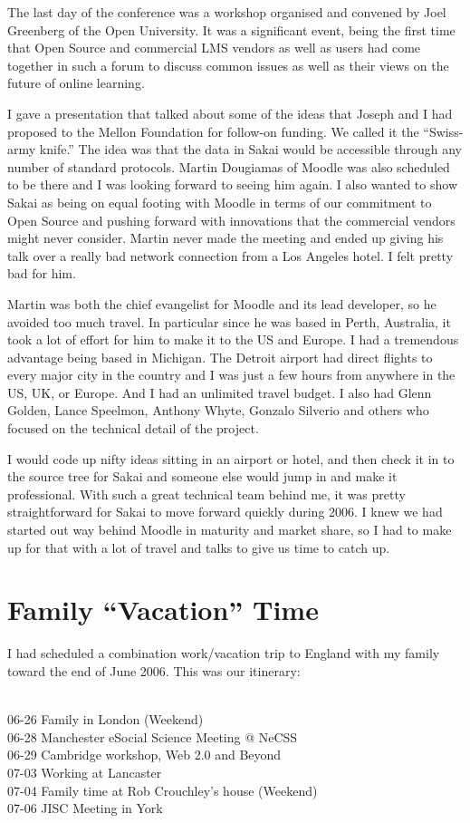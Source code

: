 \documentclass[12pt]{book}
\begin{document}
The last day of the conference was a workshop organised and convened by
Joel Greenberg of the Open University. It was a significant event,
being the first time that Open Source and commercial LMS vendors
as well as users had come together in such a forum to discuss common
issues as well as their views on the future of online learning.

I gave a presentation that talked about some of the ideas that Joseph and I had
proposed to the Mellon Foundation for follow-on funding.  We called
it the ``Swiss-army knife.''  The idea was that the data in Sakai would
be accessible through any number of standard protocols.  Martin Dougiamas
of Moodle was also scheduled to be there and I was looking forward to
seeing him again.  I also wanted to show Sakai as being on equal
footing with Moodle in terms of our commitment to Open Source and
pushing forward with innovations that the commercial vendors might never
consider.  Martin never made the meeting and ended up giving his talk
over a really bad network connection from a Los Angeles hotel.
I felt pretty bad for him.

Martin was both the chief evangelist for Moodle and its lead developer,
so he avoided too much travel.  In particular since he was based
in Perth, Australia, it took a lot of effort for him to make it
to the US and Europe.  I had a tremendous advantage being based in Michigan.
The Detroit airport had direct flights to every major city in the country
and I was just a few hours from anywhere in the US, UK, or Europe.
And I had an unlimited travel budget.  I also had Glenn Golden,
Lance Speelmon, Anthony Whyte, Gonzalo Silverio and others who focused
on the technical detail of the project.

I would code up nifty ideas sitting in an airport or hotel, and then check
it in to the source tree for Sakai and someone else would jump
in and make it professional.  With such a great technical team behind me,
it was pretty straightforward for Sakai to move forward quickly
during 2006.  I knew we had started out way behind Moodle in maturity
and market share, so I had to make up for that with a lot of travel
and talks to give us time to catch up.

\chapter{Family ``Vacation'' Time}

I had scheduled a combination work/vacation trip to England with my family
toward the end of June 2006.  This was our itinerary:\\
\\
\begin{sf}
06-26 Family in London (Weekend)\\
06-28 Manchester eSocial Science Meeting @ NeCSS\\
06-29 Cambridge workshop, Web 2.0 and Beyond\\
07-03 Working at Lancaster\\
07-04 Family time at Rob Crouchley's house (Weekend)\\
07-06 JISC Meeting in York\\
\end{sf}
\end{document}
